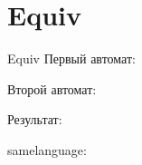 \section{Equiv}
\begin{frame}{Equiv}
	Первый автомат:


	Второй автомат:


	Результат:

	samelanguage:


\end{frame}


